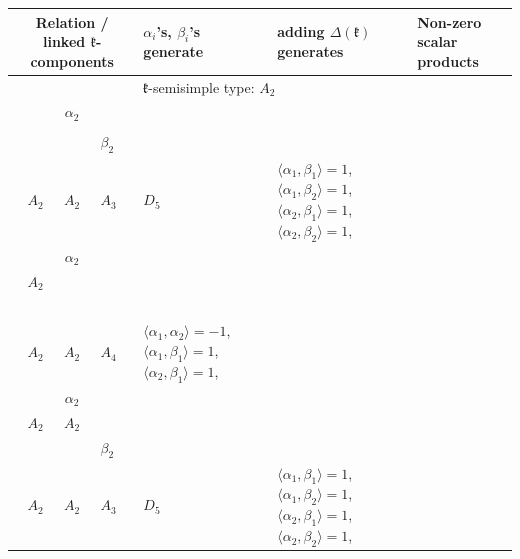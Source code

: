 \documentclass[12pt]{report}
\begin{document}
\begin{appendix}
{\begin{longtable}{rcl p{1cm}p{1cm}p{3cm} } \multicolumn{3}{c}{ Relation / linked $\mathfrak{k}$-components} &$\alpha_i$'s, $\beta_i$'s generate & adding $\Delta(\mathfrak{k})$ generates&Non-zero scalar products\endhead
\\\hline\multicolumn{5}{c}{$\mathfrak{k}$-semisimple type: $A_2$}\\
\hline\hline\begin{tabular}{cc}$\alpha_1$+ & $\alpha_2$\\\tiny{  } & \tiny{  }\end{tabular} &\begin{tabular}{c} = \\~ \end{tabular} & \begin{tabular}{cc}$\beta_1$+ & $\beta_2$\\\tiny{ $A_2$ } & \tiny{ $A_2$ }\end{tabular} & $A_3$ & $D_5$ &  $\langle\alpha_1, \beta_1\rangle=1$, $\langle\alpha_1, \beta_2\rangle=1$, $\langle\alpha_2, \beta_1\rangle=1$, $\langle\alpha_2, \beta_2\rangle=1$, 
\\
\begin{tabular}{cc}$\alpha_1$+ & $\alpha_2$\\\tiny{ $A_2$ } & \tiny{  }\end{tabular} &\begin{tabular}{c} = \\~ \end{tabular} & \begin{tabular}{c}$\beta_1$\\\tiny{ $A_2$ }\end{tabular} & $A_2$ & $A_4$ & $\langle\alpha_1, \alpha_2\rangle=-1$,  $\langle\alpha_1, \beta_1\rangle=1$, $\langle\alpha_2, \beta_1\rangle=1$, 
\\
\begin{tabular}{cc}$\alpha_1$+ & $\alpha_2$\\\tiny{ $A_2$ } & \tiny{ $A_2$ }\end{tabular} &\begin{tabular}{c} = \\~ \end{tabular} & \begin{tabular}{cc}$\beta_1$+ & $\beta_2$\\\tiny{ $A_2$ } & \tiny{ $A_2$ }\end{tabular} & $A_3$ & $D_5$ &  $\langle\alpha_1, \beta_1\rangle=1$, $\langle\alpha_1, \beta_2\rangle=1$, $\langle\alpha_2, \beta_1\rangle=1$, $\langle\alpha_2, \beta_2\rangle=1$, 

\end{longtable}}
\end{appendix}
\end{document}
